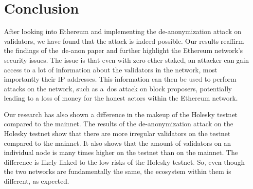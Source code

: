

\section{Conclusion}\label{sec:conclusion}
After looking into Ethereum and implementing the de-anonymization attack on validators, we have found that the attack is indeed possible.
Our results reaffirm the findings of the~\gls{de-anon paper} and further highlight the Ethereum network's security issues.
The issue is that even with zero ether staked, an attacker can gain access to a lot of information about the validators in the network, most importantly their IP addresses.
This information can then be used to perform attacks on the network, such as a~\gls{dos} attack on block proposers, potentially leading to a loss of money for the honest actors within the Ethereum network.


Our research has also shown a difference in the makeup of the Holesky testnet compared to the mainnet.
The results of the de-anonymization attack on the Holesky testnet show that there are more irregular validators on the testnet compared to the mainnet.
It also shows that the amount of validators on an individual node is many times higher on the testnet than on the mainnet.
The difference is likely linked to the low risks of the Holesky testnet.
So, even though the two networks are fundamentally the same, the ecosystem within them is different, as expected.